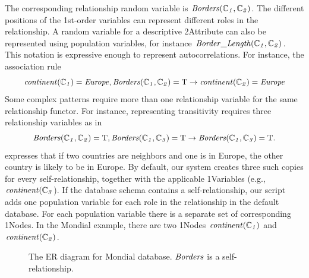 \documentclass{acm_proc_article-sp}
\begin{document}
The corresponding relationship random variable is $\it{Borders}(\mathbb{C}_{1},\mathbb{C}_{2})$. The different positions of the 1st-order variables can represent different roles in the relationship. A random variable for a descriptive 2Attribute can also be represented using population variables, for instance $\it{Border\_Length}(\mathbb{C}_{1},\mathbb{C}_{2})$. %
This notation is expressive enough to represent autocorrelations. 
For instance, the association rule
$$\it{continent}(\mathbb{C}_{1}) = \it{Europe}, \it{Borders}(\mathbb{C}_{1}, \mathbb{C}_{2}) = \mathrm{T} \rightarrow \it{continent}(\mathbb{C}_{2}) = \it{Europe}$$
Some complex patterns require more than one relationship variable for the same relationship functor. For instance, representing transitivity requires three relationship variables as in 
$$\it{Borders}(\mathbb{C}_{1}, \mathbb{C}_{2}) = \mathrm{T},  \it{Borders}(\mathbb{C}_{1}, \mathbb{C}_{3}) = \mathrm{T} \rightarrow \it{Borders}(\mathbb{C}_{1}, \mathbb{C}_{3}) = \mathrm{T}.$$
expresses that if two countries are neighbors and one is in Europe, the other country is likely to be in Europe. By default, our system creates three such copies for every self-relationship, together with the applicable 1Variables (e.g., $\it{continent}(\mathbb{C}_{3}$).
If the database schema contains a self-relationship, our script adds one population variable for each role in the relationship in the default database. For each population variable there is a separate set of corresponding 1Nodes. In the Mondial example, there are two 1Nodes $\it{continent}(\mathbb{C}_{1})$ and $\it{continent}(\mathbb{C}_{2})$.
\begin{figure}[htbp] %
 \centering
{} 
\caption{The ER diagram for Mondial database. $\it{Borders}$ is a self-relationship. 
}
 \label{fig:mondial-er}
\end{figure}
\end{document}
